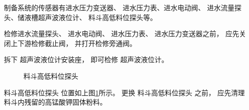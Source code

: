 \documentclass[UTF8,a4paper,12pt,titlepage]{ctexart}
\begin{document}
            制备系统的传感器有进水压力变送器、
            进水压力表、进水电动阀、
            进水流量探头、储液槽超声波液位计、
            料斗高低料位探头等。

            \par 检修进水流量探头、
            进水电动阀、
            进水压力表、
            进水压力变送器之前，
            应先关闭上下游检修截止阀，
            并打开检修旁通阀。
            \par 拆下
            超声波液位计安装座， 
            即可检修
            超声波液位计。

            \newpage

            \begin{figure}[h]
                \centering
                \caption{料斗高低料位探头}\label{fig:p20}
            \end{figure}

            \par 料斗高低料位探头
            位置如上图\ref{fig:p20}所示。
            更换
            料斗高低料位探头
            之前，
            应先清理料斗内残留的高锰酸钾固体粉料。
        
\end{document}
